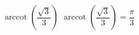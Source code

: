  {$\operatorname{arccot} \left( \dfrac{\sqrt{3}}{3} \right)$}
{ $\operatorname{arccot} \left( \dfrac{\sqrt{3}}{3} \right) = \dfrac{\pi}{3}$}

